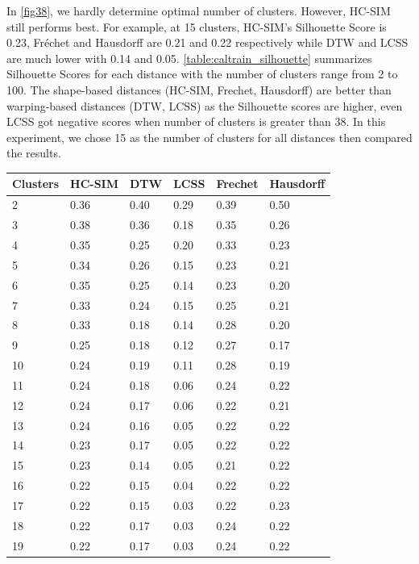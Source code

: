 \documentclass[a4paper, 12pt]{article}
\begin{document}
In \autoref{fig38}, we hardly determine optimal number of clusters. However, HC-SIM still performs best. For example, at 15 clusters, HC-SIM's Silhouette Score is 0.23, Fréchet and Hausdorff are 0.21 and 0.22 respectively while DTW and LCSS are much lower with 0.14 and 0.05. \autoref{table:caltrain_silhouette} summarizes Silhouette Scores for each distance with the number of clusters range from 2 to 100. The shape-based distances (HC-SIM, Frechet, Hausdorff) are better than warping-based distances (DTW, LCSS) as the Silhouette scores are higher, even LCSS got negative scores when number of clusters is greater than 38. In this experiment, we chose 15 as the number of clusters for all distances then compared the results.

\begin{tabularx}{\linewidth}{|X|X|X|X|X|X|}
    \caption{Caltrain Silhouette Scores.} \\
    \hline \textbf{Clusters} & \textbf{HC-SIM} & \textbf{DTW} & \textbf{LCSS} & \textbf{Frechet} & \textbf{Hausdorff} \\
    \hline
    \hline
    2 & 0.36 & 0.40 & 0.29 & 0.39 & 0.50 \\
    3 & 0.38 & 0.36 & 0.18 & 0.35 & 0.26 \\
    4 & 0.35 & 0.25 & 0.20 & 0.33 & 0.23 \\
    5 & 0.34 & 0.26 & 0.15 & 0.23 & 0.21 \\
    6 & 0.35 & 0.25 & 0.14 & 0.23 & 0.20 \\
    7 & 0.33 & 0.24 & 0.15 & 0.25 & 0.21 \\
    8 & 0.33 & 0.18 & 0.14 & 0.28 & 0.20 \\
    9 & 0.25 & 0.18 & 0.12 & 0.27 & 0.17 \\
    10 & 0.24 & 0.19 & 0.11 & 0.28 & 0.19 \\
    11 & 0.24 & 0.18 & 0.06 & 0.24 & 0.22 \\
    12 & 0.24 & 0.17 & 0.06 & 0.22 & 0.21 \\
    13 & 0.24 & 0.16 & 0.05 & 0.22 & 0.22 \\
    14 & 0.23 & 0.17 & 0.05 & 0.22 & 0.22 \\
    15 & 0.23 & 0.14 & 0.05 & 0.21 & 0.22 \\
    16 & 0.22 & 0.15 & 0.04 & 0.22 & 0.22 \\
    17 & 0.22 & 0.15 & 0.03 & 0.22 & 0.23 \\
    18 & 0.22 & 0.17 & 0.03 & 0.24 & 0.22 \\
    19 & 0.22 & 0.17 & 0.03 & 0.24 & 0.22 \\

\end{tabularx}
\end{document}
